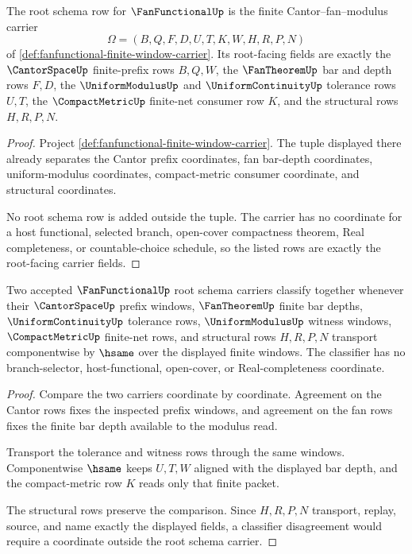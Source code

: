 \begin{theorem}
\label{thm:fanfunctional-root-schema-carrier}
The root schema row for $\FanFunctionalUp$ is the finite Cantor--fan--modulus carrier
$$
\Omega=(B,Q,F,D,U,T,K,W,H,R,P,N)
$$
of \autoref{def:fanfunctional-finite-window-carrier}. Its root-facing fields are exactly the $\CantorSpaceUp$ finite-prefix rows $B,Q,W$, the $\FanTheoremUp$ bar and depth rows $F,D$, the $\UniformModulusUp$ and $\UniformContinuityUp$ tolerance rows $U,T$, the $\CompactMetricUp$ finite-net consumer row $K$, and the structural rows $H,R,P,N$.
\end{theorem}
\begin{proof}
Project \autoref{def:fanfunctional-finite-window-carrier}. The tuple displayed there already separates the Cantor prefix coordinates, fan bar-depth coordinates, uniform-modulus coordinates, compact-metric consumer coordinate, and structural coordinates.

No root schema row is added outside the tuple. The carrier has no coordinate for a host functional, selected branch, open-cover compactness theorem, Real completeness, or countable-choice schedule, so the listed rows are exactly the root-facing carrier fields.
\end{proof}

\begin{theorem}
\label{thm:fanfunctional-root-schema-classifier}
Two accepted $\FanFunctionalUp$ root schema carriers classify together whenever their $\CantorSpaceUp$ prefix windows, $\FanTheoremUp$ finite bar depths, $\UniformContinuityUp$ tolerance rows, $\UniformModulusUp$ witness windows, $\CompactMetricUp$ finite-net rows, and structural rows $H,R,P,N$ transport componentwise by $\hsame$ over the displayed finite windows. The classifier has no branch-selector, host-functional, open-cover, or Real-completeness coordinate.
\end{theorem}
\begin{proof}
Compare the two carriers coordinate by coordinate. Agreement on the Cantor rows fixes the inspected prefix windows, and agreement on the fan rows fixes the finite bar depth available to the modulus read.

Transport the tolerance and witness rows through the same windows. Componentwise $\hsame$ keeps $U,T,W$ aligned with the displayed bar depth, and the compact-metric row $K$ reads only that finite packet.

The structural rows preserve the comparison. Since $H,R,P,N$ transport, replay, source, and name exactly the displayed fields, a classifier disagreement would require a coordinate outside the root schema carrier.
\end{proof}

